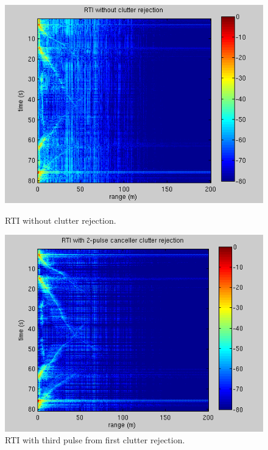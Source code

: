 \documentclass{article}
\begin{document}
\begin{figure}[htb]
\begin{minipage}[b]{0.33\linewidth}
\centering
\includegraphics[width=\textwidth]{Figures/no_rejection_31.png}
\caption{RTI without clutter rejection.}
\label{fig:no_rejection_31}
\end{minipage}
\begin{minipage}[b]{0.33\linewidth}
\centering
\includegraphics[width=\textwidth]{Figures/rejection_31.png}
\caption{RTI with third pulse from first clutter rejection.}
\label{fig:rejection_31}
\end{minipage}
\begin{minipage}[b]{0.33\linewidth}
\centering

\end{minipage}
\end{figure}
\end{document}

